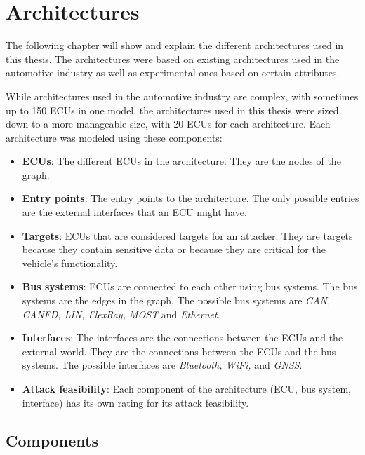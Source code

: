 \chapter{Architectures}
\label{chp:arch}

The following chapter will show and explain the different architectures used in this thesis.
The architectures were based on existing architectures used in the automotive industry as well as experimental ones based on certain attributes.

While architectures used in the automotive industry are complex, with sometimes up to 150 ECUs in one model, 
the architectures used in this thesis were sized down to a more manageable size, with 20 ECUs for each architecture.
Each architecture was modeled using these components:

\begin{itemize}

    \item \textbf{ECUs}: The different ECUs in the architecture. They are the nodes of the graph.
    
    \item \textbf{Entry points}: The entry points to the architecture. The only possible entries are the external interfaces that an ECU might have.
    
    \item \textbf{Targets}: ECUs that are considered targets for an attacker. They are targets because they contain sensitive data or because they are critical for the vehicle's functionality.
    
    \item \textbf{Bus systems}: ECUs are connected to each other using bus systems. The bus systems are the edges in the graph. The possible bus systems are \textit{CAN, CANFD, LIN, FlexRay, MOST} and \textit{Ethernet}.
    
    \item \textbf{Interfaces}: The interfaces are the connections between the ECUs and the external world. They are the connections between the ECUs and the bus systems. The possible interfaces are \textit{Bluetooth, WiFi,} and \textit{GNSS}.
    
    \item \textbf{Attack feasibility}: Each component of the architecture (ECU, bus system, interface) has its own rating for its attack feasibility.

\end{itemize}

\section{Components}
\label{sec:components}

